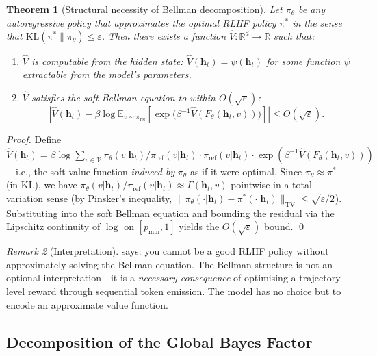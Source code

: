 \documentclass[11pt,a4paper]{article}
\theoremstyle{plain}
\newtheorem{theorem}{Theorem}[section]
\theoremstyle{definition}
\theoremstyle{remark}
\newtheorem{remark}[theorem]{Remark}
\newcommand{\R}{\mathbb{R}}
\newcommand{\E}{\mathbb{E}}
\newcommand{\KL}{\mathrm{KL}}
\newcommand{\TV}{\mathrm{TV}}
\newcommand{\vocab}{\mathcal{V}}
\begin{document}
\begin{theorem}[Structural necessity of Bellman decomposition]\label{thm:necessity}
Let $\pi_\theta$ be any autoregressive policy that approximates the optimal
RLHF policy $\pi^*$ in the sense that
$\KL(\pi^* \| \pi_\theta) \leq \varepsilon$.
Then there exists a function $\hat{V}: \R^d \to \R$ such that:
\begin{enumerate}[label=(\roman*)]
  \item $\hat{V}$ is computable from the hidden state: $\hat{V}(\bm{h}_t) =
        \psi(\bm{h}_t)$ for some function $\psi$ extractable from the model's
        parameters.
  \item $\hat{V}$ satisfies the soft Bellman equation to within
        $O(\sqrt{\varepsilon})$:
        \[
          \left|\hat{V}(\bm{h}_t) - \beta \log
          \E_{v \sim \pi_{\mathrm{ref}}}\!\left[
            \exp\!\bigl(\beta^{-1} \hat{V}(F_\theta(\bm{h}_t, v))\bigr)
          \right]\right|
          \leq O(\sqrt{\varepsilon}).
        \]
\end{enumerate}
\end{theorem}

\begin{proof}
Define $\hat{V}(\bm{h}_t) = \beta \log \sum_{v \in \vocab}
\pi_\theta(v|\bm{h}_t) / \pi_{\mathrm{ref}}(v|\bm{h}_t) \cdot
\pi_{\mathrm{ref}}(v|\bm{h}_t) \cdot
\exp(\beta^{-1} \hat{V}(F_\theta(\bm{h}_t, v)))$---i.e., the soft value
function \emph{induced by} $\pi_\theta$ as if it were optimal. Since
$\pi_\theta \approx \pi^*$ (in KL), we have
$\pi_\theta(v|\bm{h}_t)/\pi_{\mathrm{ref}}(v|\bm{h}_t) \approx
\Gamma(\bm{h}_t, v)$ pointwise in a total-variation sense (by Pinsker's
inequality, $\|\pi_\theta(\cdot|\bm{h}_t) - \pi^*(\cdot|\bm{h}_t)\|_{\TV}
\leq \sqrt{\varepsilon/2}$). Substituting into the soft Bellman equation
and bounding the residual via the Lipschitz continuity of $\log$ on $[p_{\min}, 1]$
yields the $O(\sqrt{\varepsilon})$ bound. \qed
\end{proof}

\begin{remark}[Interpretation]
 says: you cannot be a good RLHF policy without
approximately solving the Bellman equation. The Bellman structure is not
an optional interpretation---it is a \emph{necessary consequence} of
optimising a trajectory-level reward through sequential token emission.
The model has no choice but to encode an approximate value function.
\end{remark}

\subsection{Decomposition of the Global Bayes Factor}
\end{document}
